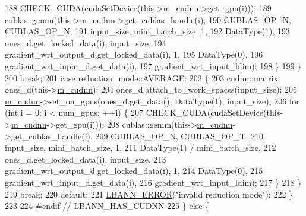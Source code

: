 \begin{DoxyCode}
188             CHECK\_CUDA(cudaSetDevice(this->\hyperlink{classlbann_1_1Layer_a08dbb94239e3b8c96329786c57c72e21}{m\_cudnn}->get\_gpu(i)));
189             cublas::gemm(this->\hyperlink{classlbann_1_1Layer_a08dbb94239e3b8c96329786c57c72e21}{m\_cudnn}->get\_cublas\_handle(i),
190                          CUBLAS\_OP\_N, CUBLAS\_OP\_N,
191                          input\_size, mini\_batch\_size, 1,
192                          DataType(1),
193                          ones\_d.get\_locked\_data(i), input\_size,
194                          gradient\_wrt\_output\_d.get\_locked\_data(i), 1,
195                          DataType(0),
196                          gradient\_wrt\_input\_d.get\_data(i),
197                          gradient\_wrt\_input\_ldim);
198           \}
199         \}
200         \textcolor{keywordflow}{break};
201       \textcolor{keywordflow}{case} \hyperlink{namespacelbann_a5975e1fb530a267728bfb01dc5c1be9ba16de38737a9f8366e9b2042b4e9b6290}{reduction\_mode::AVERAGE}:
202         \{
203           cudnn::matrix ones\_d(this->\hyperlink{classlbann_1_1Layer_a08dbb94239e3b8c96329786c57c72e21}{m\_cudnn});
204           ones\_d.attach\_to\_work\_spaces(input\_size);
205           \hyperlink{classlbann_1_1Layer_a08dbb94239e3b8c96329786c57c72e21}{m\_cudnn}->set\_on\_gpus(ones\_d.get\_data(), DataType(1), input\_size);
206           \textcolor{keywordflow}{for} (\textcolor{keywordtype}{int} i = 0; i < num\_gpus; ++i) \{
207             CHECK\_CUDA(cudaSetDevice(this->\hyperlink{classlbann_1_1Layer_a08dbb94239e3b8c96329786c57c72e21}{m\_cudnn}->get\_gpu(i)));
208             cublas::gemm(this->\hyperlink{classlbann_1_1Layer_a08dbb94239e3b8c96329786c57c72e21}{m\_cudnn}->get\_cublas\_handle(i),
209                          CUBLAS\_OP\_N, CUBLAS\_OP\_T,
210                          input\_size, mini\_batch\_size, 1,
211                          DataType(1) / mini\_batch\_size,
212                          ones\_d.get\_locked\_data(i), input\_size,
213                          gradient\_wrt\_output\_d.get\_locked\_data(i), 1,
214                          DataType(0),
215                          gradient\_wrt\_input\_d.get\_data(i),
216                          gradient\_wrt\_input\_ldim);
217           \}
218         \}
219         \textcolor{keywordflow}{break};
220       \textcolor{keywordflow}{default}:
221         \hyperlink{base_8hpp_a80b1d707117e968a6951b7222e4b2b87}{LBANN\_ERROR}(\textcolor{stringliteral}{"invalid reduction mode"});
222       \}
223 
224 \textcolor{preprocessor}{   #endif // LBANN\_HAS\_CUDNN}
225     \} \textcolor{keywordflow}{else} \{

\end{DoxyCode}
